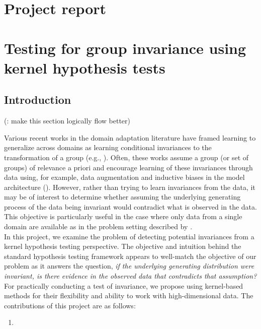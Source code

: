 

\section{Project report}
\vspace{1em}

\section*{Testing for group invariance using kernel hypothesis tests}
\vspace{1em}

\begin{abstract}
\todo
\end{abstract}


\subsection{Introduction}

(\todo: make this section logically flow better)

Various recent works in the domain adaptation literature have framed learning to generalize across domains as learning conditional invariances to the transformation of a group (e.g., \parencite{Mouli:2021,Schwobel:2021} \todo). Often, these works assume a group (or set of groups) of relevance a priori and encourage learning of these invariances through data using, for example, data augmentation and inductive biases in the model architecture (\todo). However, rather than trying to learn invariances from the data, it may be of interest to determine whether assuming the underlying generating process of the data being invariant would contradict what is observed in the data. This objective is particularly useful in the case where only data from a single domain are available as in the problem setting described by \textcite{Mouli:2021}.
\\

In this project, we examine the problem of detecting potential invariances from a kernel hypothesis testing perspective. The objective and intuition behind the standard hypothesis testing framework appears to well-match the objective of our problem as it answers the question, \textit{if the underlying generating distribution were invariant, is there evidence in the observed data that contradicts that assumption?} For practically conducting a test of invariance, we propose using kernel-based methods for their flexibility and ability to work with high-dimensional data. The contributions of this project are as follows:
\begin{enumerate}

\item

\end{enumerate}

